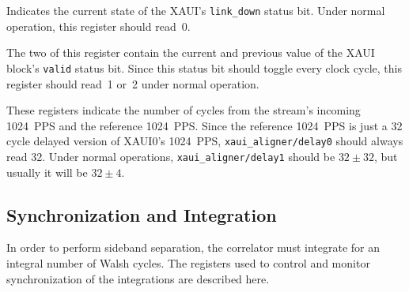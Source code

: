 \documentclass[12pt]{article}
\begin{document}
\begin{description}
 Indicates the current state of the XAUI's
\verb|link_down| status bit.  Under normal operation, this register should
read~0.

 The two \LSbs of this register contain the current and
previous value of the XAUI block's \verb|valid| status bit.  Since this status
bit should toggle every clock cycle, this register should read~1 or~2 under
normal operation.

 These registers indicate the number of cycles
from the stream's incoming 1024~PPS and the reference 1024~PPS.  Since the
reference 1024~PPS is just a 32 cycle delayed version of XAUI0's 1024~PPS,
\verb|xaui_aligner/delay0| should always read 32.  Under normal operations,
\verb|xaui_aligner/delay1| should be $32\pm32$, but usually it will be
$32\pm4$.
\end{description}

\subsection{Synchronization and Integration}

In order to perform sideband separation, the correlator must integrate for an
integral number of Walsh cycles.  The registers used to control and monitor
synchronization of the integrations are described here.
\end{document}
